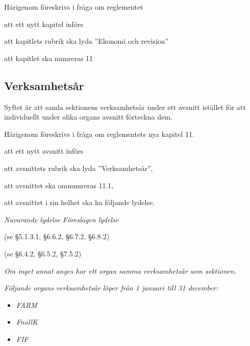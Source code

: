 \documentclass{article}
\newenvironment{lydelse}
    {\begin{paracol}{2}%
        \emph{Nuvarande lydelse}%
        \switchcolumn%
        \emph{Föreslagen lydelse}%
    \end{paracol}%
    \begin{enumerate}[label=\thesubsection.\arabic*]%
    \begin{paracol}{2}%
    }{\end{paracol}\end{enumerate}}
\begin{document}
Härigenom föreskrivs i fråga om reglementet

\begin{dels}
    \item att ett nytt kapitel införs
    \item att kapitlets rubrik ska lyda ''Ekonomi och revision''
    \item att kapitlet ska numreras 11
\end{dels}

\subsection{Verksamhetsår}
Syftet är att samla sektionens verksamhetsår under ett avsnitt istället för att individuellt under olika organs avsnitt förteckna dem.

Härigenom föreskrivs i fråga om reglementets nya kapitel 11.

\begin{dels}
    \item att ett nytt avsnitt införs
    \item att avsnittets rubrik ska lyda ''Verksamhetsår'',
    \item att avsnittet ska omnumreras 11.1,
    \item att avsnittet i sin helhet ska ha följande lydelse.
\end{dels}
\begin{lydelse}
    
    \item[] (se \S5.1.3.1, \S6.6.2, \S6.7.2, \S6.8.2)
    \item[]
    \item[] (se \S6.4.2, \S6.5.2, \S7.5.2)
    
    \switchcolumn
  
   \item \emph{Om inget annat anges har ett organ samma verksamhetsår som sektionen.}
    \label{R:VanligtVerksamhetsar}
    
   \item \emph{Följande organs verksamhetsår löper från 1 januari till 31 december:}
   \label{R:BrutnaVerksamhetsar}
    \begin{itemize}
        \item \emph{FARM}
        \item \emph{FnollK}
        \item \emph{FIF}
    \end{itemize} 


\end{lydelse}
\end{document}
